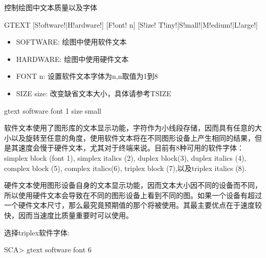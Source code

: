 \label{cmd:gtext}

控制绘图中文本质量以及字体

\begin{SACSTX}
GTEXT [S!oftware!|H!ardware!] [F!ont! n] [S!ize! T!iny!|S!mall!|M!edium!|L!arge!]
\end{SACSTX}

\begin{itemize}
\item SOFTWARE:  绘图中使用软件文本
\item HARDWARE:  绘图中使用硬件文本 
\item FONT n:  设置软件文本字体为n,n取值为1到8 
\item SIZE size:  改变缺省文本大小，具体请参考TSIZE 
\end{itemize}

\begin{SACDFT}
gtext software font 1 size small
\end{SACDFT}

软件文本使用了图形库的文本显示功能，字符作为小线段存储，因而具有任意的大小以及旋转至任意的角度，使用软件文本将在不同图形设备上产生相同的结果，但是其速度会慢于硬件文本，尤其对于终端来说。目前有8种可用的软件字体：simplex block (font 1), simplex italics (2), duplex block(3), duplex italics (4), complex block (5), complex italics(6), triplex block (7),以及triplex italics (8).  

硬件文本使用图形设备自身的文本显示功能，因而文本大小因不同的设备而不同，所以使用硬件文本会导致在不同的图形设备上看到不同的图。如果一个设备有超过一个硬件文本尺寸，那么最究竟预期值的那个将被使用。其最主要优点在于速度较快，因而当速度比质量重要时可以使用。

选择triplex软件字体:
\begin{SACCode}
SCA> gtext software font 6
\end{SACCode}

